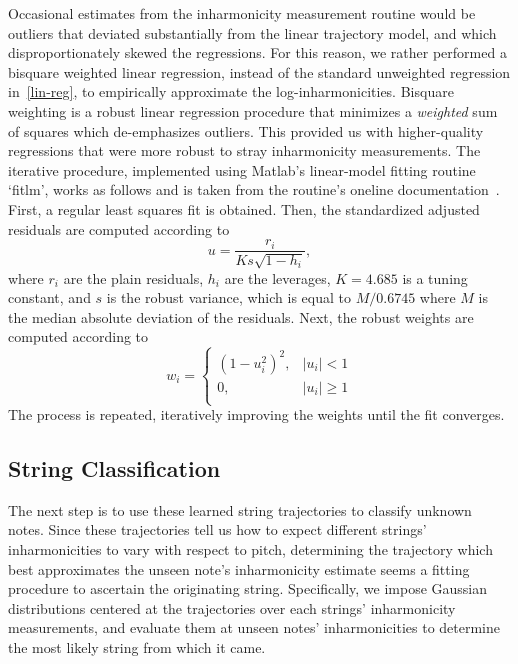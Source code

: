 \documentclass[12pt]{cmuthesis}
\begin{document}
Occasional estimates from the inharmonicity measurement routine would be outliers that deviated substantially from the linear trajectory model, and which disproportionately skewed the regressions. For this reason, we rather performed a bisquare weighted linear regression, instead of the standard unweighted regression in~\eqref{lin-reg}, to empirically approximate the log-inharmonicities. Bisquare weighting is a robust linear regression procedure that minimizes a \textit{weighted} sum of squares which de-emphasizes outliers. This provided us with higher-quality regressions that were more robust to stray inharmonicity measurements. The iterative procedure, implemented using Matlab's linear-model fitting routine `fitlm', works as follows and is taken from the routine's oneline documentation~\cite{matlab-robustfit}. First, a regular least squares fit is obtained. Then, the standardized adjusted residuals are computed according to
\begin{equation}
u = \frac{r_i}{Ks\sqrt{1-h_i}},
\end{equation}
where $r_i$ are the plain residuals, $h_i$ are the leverages, $K = 4.685$ is a tuning constant, and $s$ is the robust variance, which is equal to $M/0.6745$ where $M$ is the median absolute deviation of the residuals. Next, the robust weights are computed according to
\begin{equation}
w_i = \begin{cases}
(1-u_i^2)^2, & |u_i| < 1\\
0, & |u_i| \geq 1\\
\end{cases}
\end{equation} 
The process is repeated, iteratively improving the weights until the fit converges.

\subsection{String Classification}
\label{sec:string-classification}
The next step is to use these learned string trajectories to classify unknown notes. Since these trajectories tell us how to expect different strings' inharmonicities to vary with respect to pitch, determining the trajectory which best approximates the unseen note's inharmonicity estimate seems a fitting procedure to ascertain the originating string. Specifically, we impose Gaussian distributions centered at the trajectories over each strings' inharmonicity measurements, and evaluate them at unseen notes' inharmonicities to determine the most likely string from which it came.
\end{document}
